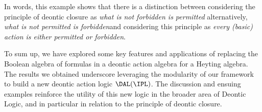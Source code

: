 \noindent In words, this example shows that there is a distinction between considering the principle of deontic closure as \emph{what is not forbidden is permitted} \textemdash alternatively, \emph{what is not permitted is forbidden}\textemdash and considering this principle as \emph{every (basic) action is either permitted or forbidden}.

To sum up, we have explored some key features and applications of replacing the Boolean algebra of formulas in a deontic action algebra for a Heyting algebra.
The results we obtained underscore leveraging the modularity of our framework to build a new deontic action logic $\DAL(\IPL)$. The discussion and ensuing examples reinforce the utility of this new logic in the broader area of Deontic Logic, and in particular in relation to the principle of deontic closure.
